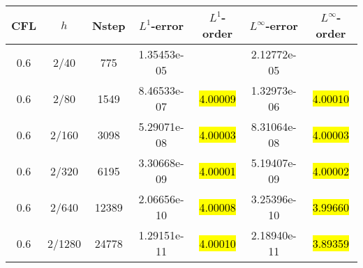 \def\titleintable{CFL&$h$&Nstep&$L^1$-error&$L^1$-order&$L^\infty$-error&$L^\infty$-order\\}

\begin{table}[htbp]
  \label{ta:1D-ex2-WHC4}
  \centering
  \begin{tabular}{ccccccc}
    \toprule
    \titleintable
    \midrule
    0.6 & 2/40   & 775   & 1.35453e-05 &              & 2.12772e-05 &              \\
    0.6 & 2/80   & 1549  & 8.46533e-07 & \hl{4.00009} & 1.32973e-06 & \hl{4.00010} \\
    0.6 & 2/160  & 3098  & 5.29071e-08 & \hl{4.00003} & 8.31064e-08 & \hl{4.00003} \\
    0.6 & 2/320  & 6195  & 3.30668e-09 & \hl{4.00001} & 5.19407e-09 & \hl{4.00002} \\
    0.6 & 2/640  & 12389 & 2.06656e-10 & \hl{4.00008} & 3.25396e-10 & \hl{3.99660} \\
    0.6 & 2/1280 & 24778 & 1.29151e-11 & \hl{4.00010} & 2.18940e-11 & \hl{3.89359} \\
    \bottomrule
  \end{tabular}
\end{table}

